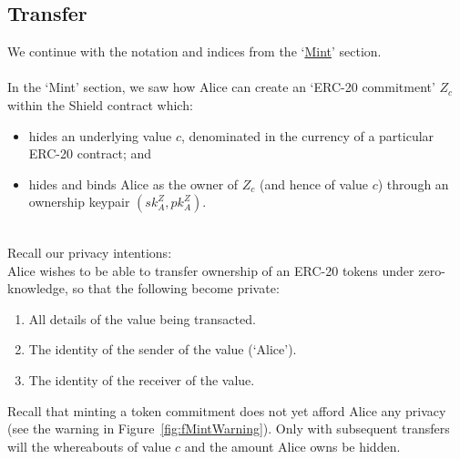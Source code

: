 \subsection{Transfer}
\label{sec:20Transfer}

We continue with the notation and indices from the `\hyperref[sec:Mint]{Mint}' section.\\
\\
In the `Mint' section, we saw how Alice can create an `ERC-20 commitment' $Z_c$ within the Shield contract which:
\begin{itemize}
  \item hides an underlying value $c$, denominated in the currency of a particular ERC-20 contract; and
  \item hides and binds Alice as the owner of $Z_c$ (and hence of value $c$) through an ownership keypair $(sk_A^Z, pk_A^Z)$.
\end{itemize}
\ \\
Recall our privacy intentions:\\
Alice wishes to be able to transfer ownership of an ERC-20 tokens under zero-knowledge, so that the following become private:
	\begin{center}
		\begin{framed}
      \begin{enumerate}
        \item All details of the value being transacted.
        \item The identity of the sender of the value (`Alice').
        \item The identity of the receiver of the value.
      \end{enumerate}
    \end{framed}
  \end{center}

\noindent
Recall that minting a token commitment does not yet afford Alice any privacy (see the warning in Figure~\ref{fig:fMintWarning}). Only with subsequent transfers will the whereabouts of value $c$ and the amount Alice owns be hidden.\\
\\



